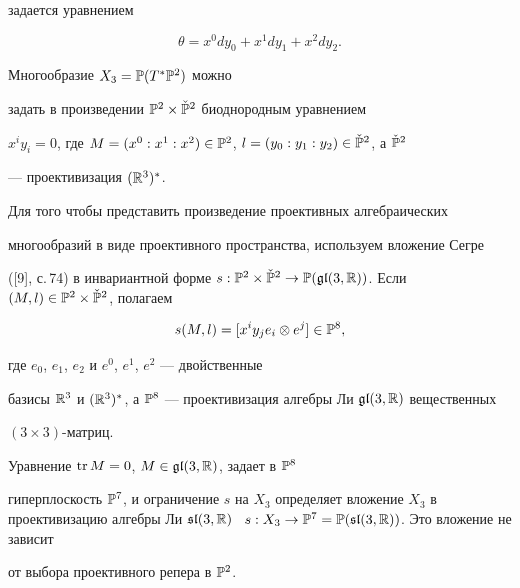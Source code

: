 задается уравнением


$$


\theta=x^0dy_0+x^1dy_1+x^2dy_2.


$$


  


Многообразие $X_3=\Bbb{P}(T^{\ast}\Bbb{P}^2)$ можно 


задать в произведении $\Bbb{P}^2\times\check{\Bbb{P}}^2$ биоднородным уравнением 


$x^iy_i=0$, где $M=(x^0: x^1: x^2)\in\Bbb{P}^2$, $l=(y_0


: y_1: y_2)\in\check{\Bbb{P}}^2$, а $\check{\Bbb{P}}^2$


--- проективизация $(\Bbb{R}^3)^{\ast}$.





Для того чтобы представить произведение проективных алгебраических 


многообразий в виде проективного пространства, используем вложение Сегре


([9], с.\,74) в инвариантной форме $s:\Bbb


{P}^2\times\check{\Bbb{P}}^2\rightarrow\Bbb{P}(\frak{gl}(3,\Bbb


{R}))$. Если $(M,l)\in\Bbb{P}^2\times\check{\Bbb{P}}^2$, полагаем 


$$


s(M,l)=[x^iy_je_i\otimes e^j]\in\Bbb{P}^8,


$$


где $e_0$, $e_1$, $e_2$ и $e^0$, $e^1$, $e^2$ --- двойственные 


базисы $\Bbb{R}^3$ и $(\Bbb{R}^3)^{\ast}$, а $\Bbb


{P}^8$ --- проективизация алгебры Ли $\frak{gl}(3,\Bbb{R})$ вещественных


$(3\times 3)$-матриц. 





Уравнение $\operatorname{tr} M=0$, $M\in\frak{gl}(3,\Bbb{R})$, задает в $\Bbb{P}^8$


гиперплоскость $\Bbb{P}^7$, и ограничение $s$ на $X_3$ определяет вложение $X_


3$ в проективизацию алгебры Ли $\frak{sl}(3,\Bbb{R})$ \ $s:X_3\rightarrow


\Bbb{P}^7=\Bbb{P}(\frak{sl}(3,\Bbb{R}))$. Это вложение не зависит 


от выбора проективного репера в $\Bbb{P}^2$.








